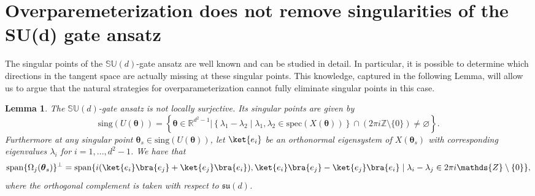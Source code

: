 \documentclass{article}
\renewcommand{\vec}[1]{\ensuremath{\boldsymbol{#1}}}
\newtheorem{lemma}{Lemma}
\begin{document}
\section{Overparemeterization does not remove singularities of the SU(d) gate ansatz}
\label{sec:overparameterization}
The singular points of the \(\mathbb{SU}(d)\)-gate ansatz are well known and can be studied in detail.
In particular, it is possible to determine which directions in the tangent space are actually missing at these singular points.
This knowledge, captured in the following Lemma, will allow us to argue that the natural strategies for overparameterization cannot fully eliminate singular points in this case.
\begin{lemma}
    \label{lem:singular_points_exp}
    The \(\mathbb{SU}(d)\)-gate ansatz is not locally surjective.
    Its singular points are given by
    \begin{equation}
        \label{eq:singular_points_first_kind}
        \mathrm{sing}(U(\vec{\theta})) = \left\{\vec{\theta} \in \mathds{R}^{d^2-1} \big| \left\{\lambda_1 - \lambda_2 \mid \lambda_1, \lambda_2 \in \mathrm{spec}\left(X(\vec{\theta})\right)\right\} \cap \left(2 \pi i \mathds{Z} \setminus \{0\}\right) \neq \varnothing \right\}.
    \end{equation}
    Furthermore at any singular point \(\vec{\theta}_s \in \mathrm{sing}(U(\vec{\theta}))\), let \(\ket{e_i}\) be an orthonormal eigensystem of \(X(\vec{\theta}_s)\) with corresponding eigenvalues \(\lambda_i\) for \(i=1,...,d^2-1\). We have that
    \begin{equation}
        \mathrm{span}\{\Omega_j(\vec{\theta}_s)\}^\perp = \mathrm{span}\{i(\ket{e_i}\bra{e_j} + \ket{e_j}\bra{e_i}),\ket{e_i}\bra{e_j} - \ket{e_j}\bra{e_i} \mid  \lambda_i - \lambda_j \in 2\pi i \mathds{Z} \setminus \{0\}\},
    \end{equation}
    where the orthogonal complement is taken with respect to \(\mathfrak{su}(d)\).
\end{lemma}
\end{document}
